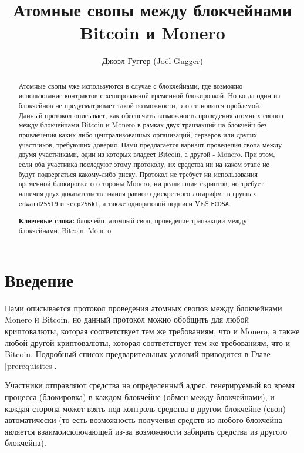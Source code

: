 \documentclass{llncs}
\begin{document}
\title{Атомные свопы между блокчейнами Bitcoin и Monero}
\author{Джоэл Гуггер (Jo\"el Gugger)}


\maketitle

\begin{abstract}
    Атомные свопы уже используются в случае с блокчейнами, где возможно использование контрактов с хешированной временной блокировкой. Но когда один из блокчейнов не предусматривает такой возможности, это становится проблемой. Данный протокол описывает, как обеспечить возможность проведения атомных свопов между блокчейнами Bitcoin и Monero в рамках двух транзакций на блокчейн без привлечения каких-либо централизованных организаций, серверов или других участников, требующих доверия.
    Нами предлагается вариант проведения свопа между двумя участниками, один из которых владеет Bitcoin, а другой - Monero. При этом, если оба участника последуют этому протоколу, их средства ни на каком этапе не будут подвергаться какому-либо риску. Протокол не требует ни использования временной блокировки со стороны Monero, ни реализации скриптов, но требует наличия двух доказательств знания равного дискретного логарифма в группах \texttt{edward25519} и \texttt{secp256k1}, а также одноразовой подписи VES \texttt{ECDSA}.\linebreak

    \textbf{Ключевые слова:} блокчейн, атомный своп, проведение транзакций между блокчейнами, Bitcoin, Monero
\end{abstract}

\section{Введение}
Нами описывается протокол проведения атомных свопов между блокчейнами Monero и Bitcoin, но данный протокол можно обобщить для любой криптовалюты, которая соответствует тем же требованиям, что и Monero, а также любой другой криптовалюты, которая соответствует тем же требованиям, что и Bitcoin. Подробный список предварительных условий приводится в Главе \ref{prerequisites}.

Участники отправляют средства на определенный адрес, генерируемый во время процесса (блокировка) в каждом блокчейне (обмен между блокчейнами), и каждая сторона может взять под контроль средства в другом блокчейне (своп) автоматически (то есть возможность получения средств из любого блокчейна является взаимоисключающей из-за возможности забирать средства из другого блокчейна).
\end{document}
